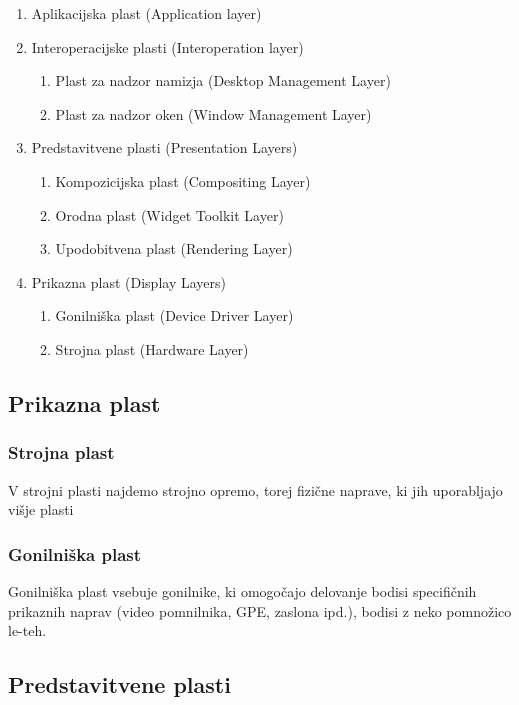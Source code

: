 \documentclass{article}
\begin{document}
\begin{enumerate}
	\item Aplikacijska plast (Application layer)
	\item Interoperacijske plasti (Interoperation layer)
	      \begin{enumerate}[label*=\arabic*.]
		      \item Plast za nadzor namizja (Desktop Management Layer)
		      \item Plast za nadzor oken (Window Management Layer)
	      \end{enumerate}
	\item Predstavitvene plasti (Presentation Layers)
	      \begin{enumerate}[label*=\arabic*.]
		      \item Kompozicijska plast (Compositing Layer)
		      \item Orodna plast (Widget Toolkit Layer)
		      \item Upodobitvena plast (Rendering Layer)
	      \end{enumerate}
	\item Prikazna plast (Display Layers)
	      \begin{enumerate}[label*=\arabic*.]
		      \item Gonilniška plast (Device Driver Layer)
		      \item Strojna plast (Hardware Layer)
	      \end{enumerate}
\end{enumerate}

\subsection{Prikazna plast}
\subsubsection{Strojna plast}
V strojni plasti najdemo strojno opremo, torej fizične naprave, ki jih uporabljajo višje plasti

\subsubsection{Gonilniška plast}
Gonilniška plast vsebuje gonilnike, ki omogočajo delovanje bodisi specifičnih prikaznih naprav (video pomnilnika, GPE, zaslona ipd.), bodisi z neko pomnožico le-teh.

\subsection{Predstavitvene plasti}
\end{document}
